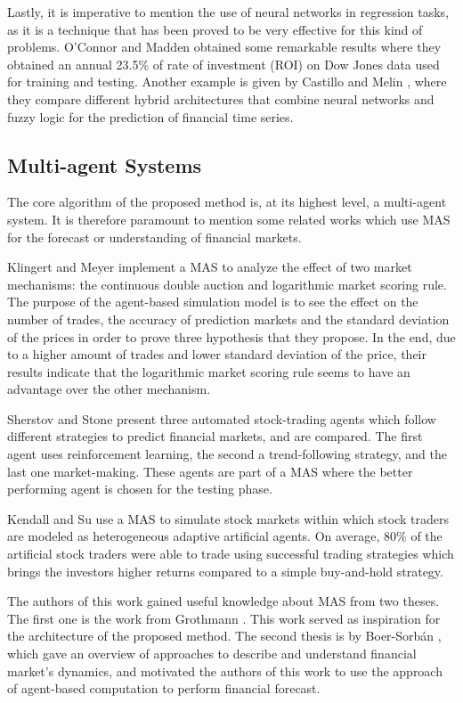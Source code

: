 \documentclass[12pt,journal,compsoc]{IEEEtran}
\begin{document}
Lastly, it is imperative to mention the use of neural networks in regression tasks, as it is a technique that has been proved to be very effective for this kind of problems. O'Connor and Madden \cite{Connor2005} obtained some remarkable results where they obtained an annual 23.5\% of rate of investment (ROI) on Dow Jones data used for training and testing. Another example is given by Castillo and Melin \cite{castillo2001simulation}, where they compare different hybrid architectures that combine neural networks and fuzzy logic for the prediction of financial time series.

\subsection{Multi-agent Systems}
\label{multi-agent-systems}

The core algorithm of the proposed method is, at its highest level, a multi-agent system. It is therefore paramount to mention some related works which use MAS for the forecast or understanding of financial markets.

Klingert and Meyer \cite{Klingert_2012} implement a MAS to analyze the effect of two market mechanisms: the continuous double auction and logarithmic market scoring rule. The purpose of the agent-based simulation model is to see the effect on the number of trades, the accuracy of prediction markets and the standard deviation of the prices in order to prove three hypothesis that they propose. In the end, due to a higher amount of trades and lower standard deviation of the price, their results indicate that the logarithmic market scoring rule seems to have an advantage over the other mechanism.

Sherstov and Stone \cite{Sherstov2005} present three automated stock-trading agents which follow different strategies to predict financial markets, and are compared. The first agent uses reinforcement learning, the second a trend-following strategy, and the last one market-making. These agents are part of a MAS where the better performing agent is chosen for the testing phase.

Kendall and Su \cite{Kendall2003} use a MAS to simulate stock markets within which stock traders are modeled as heterogeneous adaptive artificial agents. On average, 80\% of the artificial stock traders were able to trade using successful trading strategies which brings the investors higher returns compared to a simple buy-and-hold strategy.

The authors of this work gained useful knowledge about MAS from two theses. The first one is the work from Grothmann \cite{Grothmann2002}. This work served as inspiration for the architecture of the proposed method. The second thesis is by Boer-Sorbán \cite{Boer-Sorban2008}, which gave an overview of approaches to describe and understand financial market's dynamics, and motivated the authors of this work to use the approach of agent-based computation to perform financial forecast.
\end{document}
